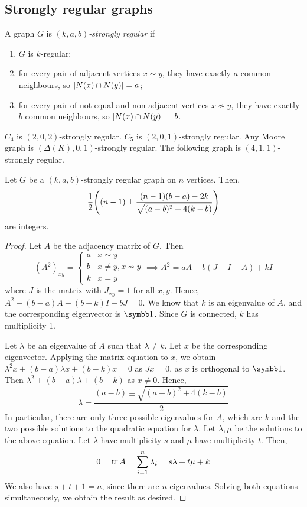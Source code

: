 \subsection{Strongly regular graphs}
\begin{definition}
	A graph \( G \) is \emph{\( (k, a, b) \)-strongly regular} if
	\begin{enumerate}
		\item \( G \) is \( k \)-regular;
		\item for every pair of adjacent vertices \( x \sim y \), they have exactly \( a \) common neighbours, so \( \abs{N(x) \cap N(y)} = a \);
		\item for every pair of not equal and non-adjacent vertices \( x \not\sim y \), they have exactly \( b \) common neighbours, so \( \abs{N(x) \cap N(y)} = b \).
	\end{enumerate}
\end{definition}
\begin{example}
	\( C_4 \) is \( (2, 0, 2) \)-strongly regular.
	\( C_5 \) is \( (2, 0, 1) \)-strongly regular.
	Any Moore graph is \( (\Delta(K), 0, 1) \)-strongly regular.
	The following graph
	is \( (4, 1, 1) \)-strongly regular.
\end{example}
\begin{theorem}
	Let \( G \) be a \( (k, a, b) \)-strongly regular graph on \( n \) vertices.
	Then,
	\[ \frac{1}{2}\qty((n-1) \pm \frac{(n-1)(b-a) - 2k}{\sqrt{(a-b)^2 + 4(k-b)}}) \]
	are integers.
\end{theorem}
\begin{proof}
	Let \( A \) be the adjacency matrix of \( G \).
	Then
	\[ (A^2)_{xy} = \begin{cases}
		a & x \sim y \\
		b & x \neq y, x \not\sim y \\
		k & x = y
	\end{cases} \implies A^2 = aA + b(J-I-A) + kI \]
	where \( J \) is the matrix with \( J_{xy} = 1 \) for all \( x, y \).
	Hence, \( A^2 + (b-a)A + (b-k)I - bJ = 0 \).
	We know that \( k \) is an eigenvalue of \( A \), and the corresponding eigenvector is \( \symbb 1 \).
	Since \( G \) is connected, \( k \) has multiplicity 1.

	Let \( \lambda \) be an eigenvalue of \( A \) such that \( \lambda \neq k \).
	Let \( x \) be the corresponding eigenvector.
	Applying the matrix equation to \( x \), we obtain \( \lambda^2 x + (b-a)\lambda x + (b-k)x = 0 \) as \( Jx = 0 \), as \( x \) is orthogonal to \( \symbb 1 \).
	Then \( \lambda^2 + (b-a)\lambda + (b-k) \) as \( x \neq 0 \).
	Hence,
	\[ \lambda = \frac{(a-b) \pm \sqrt{(a-b)^2 + 4(k-b)}}{2} \]
	In particular, there are only three possible eigenvalues for \( A \), which are \( k \) and the two possible solutions to the quadratic equation for \( \lambda \).
	Let \( \lambda, \mu \) be the solutions to the above equation.
	Let \( \lambda \) have multiplicity \( s \) and \( \mu \) have multiplicity \( t \).
	Then,
	\[ 0 = \tr A = \sum_{i=1}^n \lambda_i = s\lambda + t\mu + k \]
	We also have \( s + t + 1 = n \), since there are \( n \) eigenvalues.
	Solving both equations simultaneously, we obtain the result as desired.
\end{proof}
